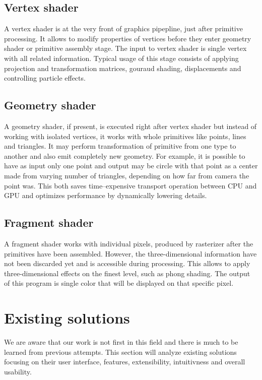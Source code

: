 \subsection{Vertex shader}
A vertex shader is at the very front of graphics pipepline, just after primitive
processing. It allows to modify properties of vertices before they enter
geometry shader or  primitive assembly stage. The input to vertex shader is
single vertex with all related information. Typical usage of this stage consists
of applying projection and transformation matrices, gouraud shading,
displacements and controlling particle effects.

\subsection{Geometry shader}
A geometry shader, if present, is executed right after vertex shader but instead
of working with isolated vertices, it works with whole primitives like points,
lines and triangles. It may perform transformation of primitive from one type to
another and also emit completely new geometry. For example, it is possible to
have as input only one point and output may be circle with that point as a
center made from varying number of triangles, depending on how far from camera
the point was. This both saves time--expensive transport operation between CPU
and GPU and optimizes performance by dynamically lowering details.

\subsection{Fragment shader}
A fragment shader works with individual pixels, produced by rasterizer after the
primitives have been assembled. However, the three-dimensional information have
not been discarded yet and is accessible during processing. This allows to apply
three-dimensional effects on the finest level, such as phong shading. The output
of this program is single color that will be displayed on that specific pixel.

\section{Existing solutions}
We are aware that our work is not first in this field and there is much to be
learned from previous attempts. This section will analyze existing solutions
focusing on their user interface, features, extensibility, intuitivness and
overall usability.

